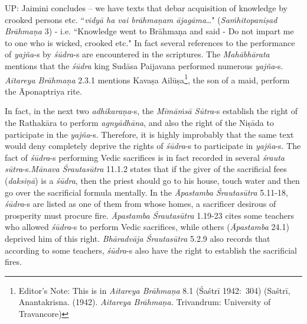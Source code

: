UP: Jaimini concludes – we have texts that debar acquisition of knowledge by crooked persons etc. ``\textit{vidyā ha vai brāhmaṇam ājagāma}…" (\textit{Saṁhitopaniṣad Brāhmaṇa} 3) - i.e. ``Knowledge went to Brāhmaṇa and said - Do not impart me to one who is wicked, crooked etc." In fact several references to the performance of \textit{yajña}-s by \textit{śūdra}-s are encountered in the scriptures. The \textit{Mahābhārata} mentions that the \textit{śūdra} king Sudāsa Paijavana performed numerous \textit{yajña}-s. \textit{Aitareya Brāhmaṇa} 2.3.1 mentions Kavaṣa Ailūṣa\footnote{Editor's Note: This is in \textit{Aitareya Brāhmaṇa} 8.1 (Śaśtrī 1942:~304) (Saśtrī, Anantakrisna. (1942). \textit{Aitareya Brāhmaṇa.} Trivandrum: University of Travancore)}, the son of a maid, perform the Āponaptriya rite.

In fact, in the next two \textit{adhikaraṇa}-s, the \textit{Mīmāṁsā Sūtra}-s establish the right of the Rathakāra to perform \textit{agnyādhāna}, and also the right of the Niṣāda to participate in the \textit{yajña}-s. Therefore, it is highly improbably that the same text would deny completely deprive the rights of \textit{śūdra}-s to participate in \textit{yajña}-s. The fact of \textit{śūdra}-s performing Vedic sacrifices is in fact recorded in several \textit{śrauta sūtra}-s.\break \textit{Mānava Śrautasūtra} 11.1.2 states that if the giver of the sacrificial fees (\textit{daksiṇā}) is a \textit{śūdra}, then the priest should go to his house, touch water and then go over the sacrificial formula mentally. In the \textit{Āpastamba Śrautasūtra} 5.11-18, \textit{śūdra}-s are listed as one of them from whose homes, a sacrificer desirous of prosperity must procure fire. \textit{Āpastamba Śrautasūtra} 1.19-23 cites some teachers who allowed \textit{śūdra}-s to perform Vedic sacrifices, while others (\textit{Āpastamba} 24.1) deprived him of this right. \textit{Bhāradvāja Śrautasūtra} 5.2.9 also records that according to some teachers, \textit{śūdra}-s also have the right to establish the sacrificial fires.


